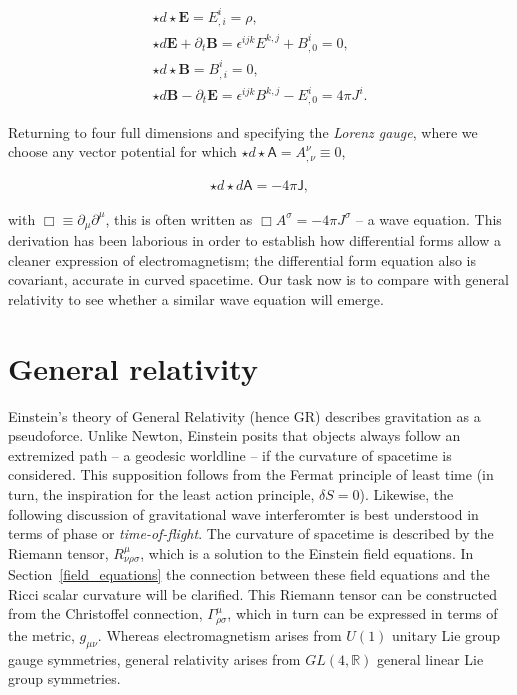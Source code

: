 
\begin{eqnarray}
\star d \star \textbf{E} = E^i_{,i} = \rho,\\
\star d \textbf{E} + \partial_t \textbf{B} = \epsilon^{ijk} E^{k,j} + B^i_{,0} = 0,\\
\star d \star \textbf{B} = B^i_{,i} = 0,\\
\star d \textbf{B} - \partial_t \textbf{E} = \epsilon^{ijk} B^{k,j} - E^i_{,0} = 4 \pi J^i.
\end{eqnarray}

Returning to four full dimensions and specifying the \textit{Lorenz gauge}, where we choose any vector potential for which $\star d \star \textsf{A} = A^\nu_{,\nu} \equiv 0$, 

\begin{eqnarray}
\star d \star d \textsf{A} = -4\pi \textsf{J},
\end{eqnarray}
        
\noindent with $\Box \equiv \partial_\mu \partial^\mu$, this is often written as $\Box A^\sigma = -4 \pi J^\sigma$ -- a wave equation. 
This derivation has been laborious in order to establish how differential forms allow a cleaner expression of electromagnetism; the differential form equation also is covariant, accurate in curved spacetime.
Our task now is to compare with general relativity to see whether a similar wave equation will emerge.

    \section{General relativity}
    \label{general_relativity}

        Einstein's theory of General Relativity (hence GR) describes gravitation as a pseudoforce. 
Unlike Newton, Einstein posits that objects always follow an extremized path -- a geodesic worldline -- if the curvature of spacetime is considered. 
This supposition follows from the Fermat principle of least time (in turn, the inspiration for the least action principle, $\delta S = 0$).
Likewise, the following discussion of gravitational wave interferomter is best understood in terms of phase or \textit{time-of-flight}.
The curvature of spacetime is described by the Riemann tensor, $R^\mu_{\nu\rho\sigma}$, which is a solution to the Einstein field equations. 
In Section~\ref{field_equations} the connection between these field equations and the Ricci scalar curvature will be clarified. 
This Riemann tensor can be constructed from the Christoffel connection, $\Gamma^\mu_{\rho\sigma}$, which in turn can be expressed in terms of the metric, $g_{\mu \nu}$.
Whereas electromagnetism arises from $U(1)$ unitary Lie group gauge symmetries, general relativity arises from $GL(4, \mathbb{R})$ general linear Lie group symmetries.

